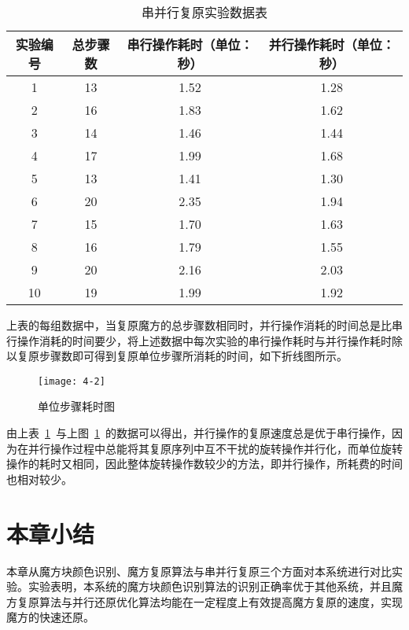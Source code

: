 \begin{table}[H]
	\caption{串并行复原实验数据表}\label{tab:4-3}
	\vspace{0.5em}
	\begin{center}
		{\wuhao
			\begin{tabular}{cccc}
				\toprule
				实验编号 & 总步骤数	& 串行操作耗时（单位：秒）&并行操作耗时（单位：秒）\\
				\midrule
				1&13&1.52&1.28\\
				2&16&1.83&1.62\\
				3&14&1.46&1.44\\
				4&17&1.99&1.68\\
				5&13&1.41&1.30\\
				6&20&2.35&1.94\\
				7&15&1.70&1.63\\
				8&16&1.79&1.55\\
				9&20&2.16&2.03\\
				10&19&1.99&1.92\\
				\bottomrule
		\end{tabular}}
	\end{center}
	\vspace{-1.5em}
\end{table}

上表的每组数据中，当复原魔方的总步骤数相同时，并行操作消耗的时间总是比串行操作消耗的时间要少，将上述数据中每次实验的串行操作耗时与并行操作耗时除以复原步骤数即可得到复原单位步骤所消耗的时间，如下折线图所示。

\begin{figure}[H]
	\centering
	\texttt{[image: 4-2]}
	\caption{单位步骤耗时图}\label{fig:4-2}
\end{figure}

由上表~\ref{tab:4-3}~与上图~\ref{fig:4-2}~的数据可以得出，并行操作的复原速度总是优于串行操作，因为在并行操作过程中总能将其复原序列中互不干扰的旋转操作并行化，而单位旋转操作的耗时又相同，因此整体旋转操作数较少的方法，即并行操作，所耗费的时间也相对较少。

\section{本章小结}

本章从魔方块颜色识别、魔方复原算法与串并行复原三个方面对本系统进行对比实验。实验表明，本系统的魔方块颜色识别算法的识别正确率优于其他系统，并且魔方复原算法与并行还原优化算法均能在一定程度上有效提高魔方复原的速度，实现魔方的快速还原。